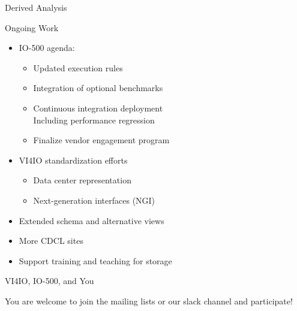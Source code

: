 \documentclass[portrait,a0paper,fontscale=0.4]{baposter}
\newcommand{\compresslist}{%
\setlength{\itemsep}{1pt}%
\setlength{\parskip}{0pt}%
\setlength{\parsep}{0pt}%
}
\begin{document}
\begin{poster}
\begin{posterbox}[name=awareness,column=3,below=engineering]{Derived Analysis}
\end{posterbox}

\begin{posterbox}[name=b4,column=3,below=awareness]{Ongoing Work}
\begin{itemize}\compresslist
\item IO-500 agenda:
  \begin{itemize}
  \item Updated execution rules
  \item Integration of optional benchmarks
  \item Continuous integration deployment \\
        Including performance regression
  \item Finalize vendor engagement program
  \end{itemize}
\item VI4IO standardization efforts
  \begin{itemize}\compresslist
  \item Data center representation
  \item Next-generation interfaces (NGI)
  \end{itemize}
\item Extended schema and alternative views
\item More CDCL sites
\item Support training and teaching for storage
\end{itemize}
\end{posterbox}


\begin{posterbox}[name=hpccertification,column=3,below=b4, above=bottom]{VI4IO, IO-500, and You}


You are welcome to join the mailing lists or our slack channel and participate!



\end{posterbox}
\end{poster}
\end{document}
